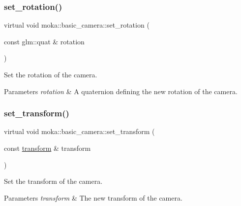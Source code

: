 \subsubsection{\texorpdfstring{set\_rotation()}{set\_rotation()}}
{\footnotesize\ttfamily virtual void moka\+::basic\+\_\+camera\+::set\+\_\+rotation (\begin{DoxyParamCaption}\item[{const glm\+::quat \&}]{rotation }\end{DoxyParamCaption})\hspace{0.3cm}{\ttfamily [virtual]}}



Set the rotation of the camera. 


\begin{DoxyParams}{Parameters}
{\em rotation} & A quaternion defining the new rotation of the camera. \\
\hline
\end{DoxyParams}
\mbox{\label{classmoka_1_1basic__camera_af33dd8db22f7da889a70507ae188fc24}} 
\subsubsection{\texorpdfstring{set\_transform()}{set\_transform()}}
{\footnotesize\ttfamily virtual void moka\+::basic\+\_\+camera\+::set\+\_\+transform (\begin{DoxyParamCaption}\item[{const \mbox{\hyperlink{classmoka_1_1transform}{transform}} \&}]{transform }\end{DoxyParamCaption})\hspace{0.3cm}{\ttfamily [virtual]}}



Set the transform of the camera. 


\begin{DoxyParams}{Parameters}
{\em transform} & The new transform of the camera. \\
\hline
\end{DoxyParams}
\mbox{\label{classmoka_1_1basic__camera_a43891fadfe629d3306c3863255660556}} 
